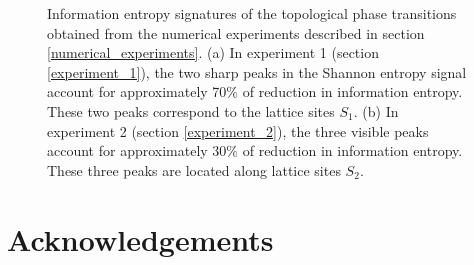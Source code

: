 \documentclass[10pt]{revtex4-1}
\begin{document}
\begin{figure}
\centering
{}\quad
{}\quad
\caption{Information entropy signatures of the topological phase transitions obtained from the numerical experiments described in section \ref{numerical_experiments}. (a) In experiment 1 (section \ref{experiment_1}), the two sharp peaks in the Shannon entropy signal account for approximately 70\% of reduction in information entropy. These two peaks correspond to the lattice sites $S_1$. (b) In experiment 2 (section \ref{experiment_2}), the three visible peaks account for approximately 30\% of reduction in information entropy. These three peaks are located along lattice sites $S_2$.}
\label{feature_importances}
\end{figure}

{}

\section*{Acknowledgements}
\end{document}
